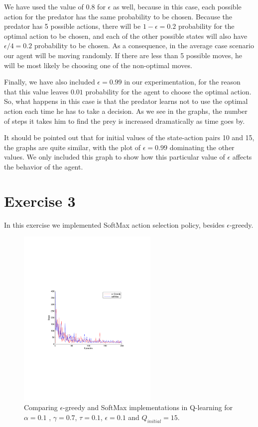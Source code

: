 \documentclass[a4paper,11pt]{article}
\begin{document}
We have used the value of 0.8 for $\epsilon$ as well, because in this case, each possible action for the predator has the same probability to be chosen. Because the predator has 5 possible actions, there will be $1-\epsilon = 0.2$ probability for the optimal action to be chosen, and each of the other possible states will also have $\epsilon /4 = 0.2$ probability to be chosen. As a consequence, in the average case scenario our agent will be moving randomly. If there are less than 5 possible moves, he will be most likely be choosing one of the non-optimal moves.


Finally, we have also included $\epsilon = 0.99$ in our experimentation, for the reason that this value leaves $0.01$ probability for the agent to choose the optimal action. So, what happens in this case is that the predator learns not to use the optimal action each time he has to take a decision. As we see in the graphs, the number of steps it takes him to find the prey is increased dramatically as time goes by.


It should be pointed out that for initial values of the state-action pairs 10 and 15, the graphs are quite similar, with the plot of $\epsilon = 0.99$ dominating the other values. We only included this graph to show how this particular value of $\epsilon$ affects the behavior of the agent.





\section*{Exercise 3}

In this exercise we implemented SoftMax action selection policy, besides $\epsilon$-greedy. 

\begin{figure}[t!]
  \centering
    \includegraphics[trim=4cm 8.5cm 4cm 8.5cm,clip,width=0.6\textwidth]{figures/egresoftcomp.pdf}
    \caption{Comparing $\epsilon$-greedy and SoftMax implementations in Q-learning for $\alpha = 0.1$ , $\gamma = 0.7$, $\tau = 0.1$, $\epsilon = 0.1$ and $Q_{initial} = 15$.}
    \label{egresoftcomp}
\end{figure}
\end{document}
